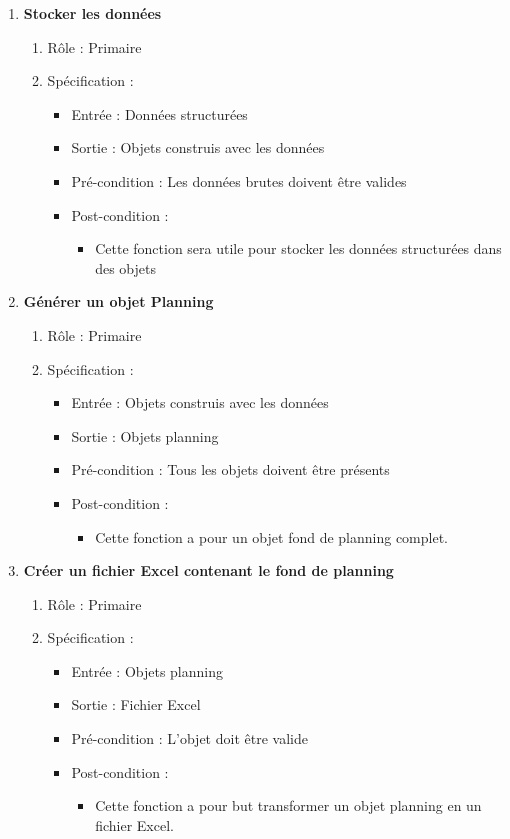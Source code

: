 \documentclass{polytech/polytech}
\begin{document}
\begin{enumerate}
		\item \textbf{Stocker les données}
		\begin{enumerate}
			\item Rôle :  Primaire
			\item Spécification :
			\begin{itemize}
				\item Entrée : Données structurées
				\item Sortie : Objets construis avec les données
				\item Pré-condition : Les données brutes doivent être valides
				\item Post-condition :
				\begin{itemize}[label=\textbullet, font=\LARGE]
					\item Cette fonction sera utile pour stocker les données structurées dans des objets
				\end{itemize}
			\end{itemize}
		\end{enumerate}
	
		\item \textbf{Générer un objet Planning}
		\begin{enumerate}
			\item Rôle :  Primaire
			\item Spécification :
			\begin{itemize}
				\item Entrée : Objets construis avec les données
				\item Sortie : Objets planning
				\item Pré-condition : Tous les objets doivent être présents
				\item Post-condition : 
				\begin{itemize}[label=\textbullet, font=\LARGE]
					\item Cette fonction a pour un objet fond de planning complet.
				\end{itemize}
			\end{itemize}
		\end{enumerate}
	
		\item \textbf{Créer un fichier Excel contenant le fond de planning}
		\begin{enumerate}
			\item Rôle :  Primaire
			\item Spécification :
			\begin{itemize}
				\item Entrée : Objets planning
				\item Sortie : Fichier Excel
				\item Pré-condition : L'objet doit être valide
				\item Post-condition :
				\begin{itemize}[label=\textbullet, font=\LARGE]
					\item Cette fonction a pour but transformer un objet planning en un fichier Excel.
				\end{itemize}
			\end{itemize}
		\end{enumerate}
	\end{enumerate}
\end{document}
